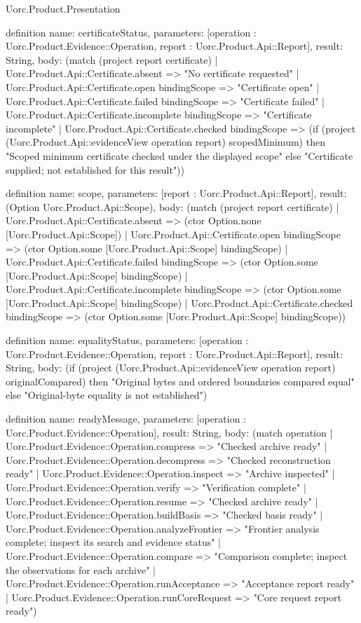 \begin{lexlean}{Uorc.Product.Presentation}
\begin{semanticmodule}
definition{
  name: certificateStatus,
  parameters: [operation : Uorc.Product.Evidence::Operation, report : Uorc.Product.Api::Report],
  result: String,
  body: (match (project report certificate)
    | Uorc.Product.Api::Certificate.absent => "No certificate requested"
    | Uorc.Product.Api::Certificate.open bindingScope => "Certificate open"
    | Uorc.Product.Api::Certificate.failed bindingScope => "Certificate failed"
    | Uorc.Product.Api::Certificate.incomplete bindingScope => "Certificate incomplete"
    | Uorc.Product.Api::Certificate.checked bindingScope => (if (project (Uorc.Product.Api::evidenceView operation report) scopedMinimum) then "Scoped minimum certificate checked under the displayed scope" else "Certificate supplied; not established for this result"))
}

definition{
  name: scope,
  parameters: [report : Uorc.Product.Api::Report],
  result: (Option Uorc.Product.Api::Scope),
  body: (match (project report certificate)
    | Uorc.Product.Api::Certificate.absent => (ctor Option.none [Uorc.Product.Api::Scope])
    | Uorc.Product.Api::Certificate.open bindingScope => (ctor Option.some [Uorc.Product.Api::Scope] bindingScope)
    | Uorc.Product.Api::Certificate.failed bindingScope => (ctor Option.some [Uorc.Product.Api::Scope] bindingScope)
    | Uorc.Product.Api::Certificate.incomplete bindingScope => (ctor Option.some [Uorc.Product.Api::Scope] bindingScope)
    | Uorc.Product.Api::Certificate.checked bindingScope => (ctor Option.some [Uorc.Product.Api::Scope] bindingScope))
}

definition{
  name: equalityStatus,
  parameters: [operation : Uorc.Product.Evidence::Operation, report : Uorc.Product.Api::Report],
  result: String,
  body: (if (project (Uorc.Product.Api::evidenceView operation report) originalCompared) then "Original bytes and ordered boundaries compared equal" else "Original-byte equality is not established")
}

definition{
  name: readyMessage,
  parameters: [operation : Uorc.Product.Evidence::Operation],
  result: String,
  body: (match operation
    | Uorc.Product.Evidence::Operation.compress => "Checked archive ready"
    | Uorc.Product.Evidence::Operation.decompress => "Checked reconstruction ready"
    | Uorc.Product.Evidence::Operation.inspect => "Archive inspected"
    | Uorc.Product.Evidence::Operation.verify => "Verification complete"
    | Uorc.Product.Evidence::Operation.resume => "Checked archive ready"
    | Uorc.Product.Evidence::Operation.buildBasis => "Checked basis ready"
    | Uorc.Product.Evidence::Operation.analyzeFrontier => "Frontier analysis complete; inspect its search and evidence status"
    | Uorc.Product.Evidence::Operation.compare => "Comparison complete; inspect the observations for each archive"
    | Uorc.Product.Evidence::Operation.runAcceptance => "Acceptance report ready"
    | Uorc.Product.Evidence::Operation.runCoreRequest => "Core request report ready")
}


\end{semanticmodule}
\end{lexlean}
